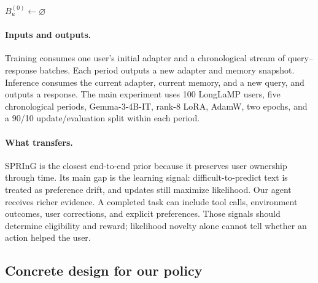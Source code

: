 \begin{algorithm}[t]
  \caption{SPRInG for one user}
  \label{alg:spring-one-user}
  $B_u^{(0)}\leftarrow\varnothing$\;
\end{algorithm}

\paragraph{Inputs and outputs.}
Training consumes one user's initial adapter and a chronological stream of
query--response batches.  Each period outputs a new adapter and memory
snapshot.  Inference consumes the current adapter, current memory, and a new
query, and outputs a response.  The main experiment uses 100 LongLaMP users,
five chronological periods, Gemma-3-4B-IT, rank-8 LoRA, AdamW, two epochs,
and a 90/10 update/evaluation split within each period.

\paragraph{What transfers.}
SPRInG is the closest end-to-end prior because it preserves user ownership
through time.  Its main gap is the learning signal: difficult-to-predict text
is treated as preference drift, and updates still maximize likelihood.  Our
agent receives richer evidence.  A completed task can include tool calls,
environment outcomes, user corrections, and explicit preferences.  Those
signals should determine eligibility and reward; likelihood novelty alone
cannot tell whether an action helped the user.

\subsection{Concrete design for our policy}

